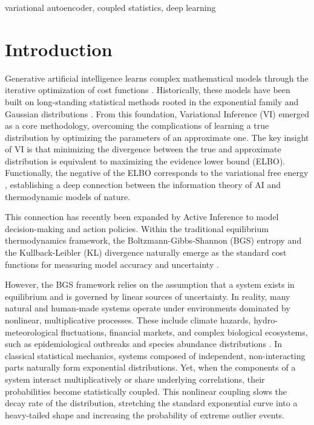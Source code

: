 \documentclass[twoside,11pt]{article}
\begin{document}
\begin{keywords}
  variational autoencoder, coupled statistics, deep learning
\end{keywords}

\section{Introduction}

Generative artificial intelligence learns complex mathematical models through the iterative optimization of cost functions \citep{bengioDeepLearning2017, kingmaIntroductionVariationalAutoencoders2019}. Historically, these models have been built on long-standing statistical methods rooted in the exponential family and Gaussian distributions \citep{amariInformationGeometryIts2016}. From this foundation, Variational Inference (VI) \citep{bleiVariationalInferenceReview2017} emerged as a core methodology, overcoming the complications of learning a true distribution by optimizing the parameters of an approximate one. The key insight of VI is that minimizing the divergence between the true and approximate distribution is equivalent to maximizing the evidence lower bound (ELBO). Functionally, the negative of the ELBO corresponds to the variational free energy \citep{fristonVariationalFreeEnergy2007}, establishing a deep connection between the information theory of AI and thermodynamic models of nature. 

This connection has recently been expanded by Active Inference \citep{parrActiveInferenceFree2022} to model decision-making and action policies. Within the traditional equilibrium thermodynamics framework, the Boltzmann-Gibbs-Shannon (BGS) entropy and the Kullback-Leibler (KL) divergence naturally emerge as the standard cost functions for measuring model accuracy and uncertainty \citep{jaynesInformationTheoryStatistical1957, mackayInformationTheoryInference2003}.

However, the BGS framework relies on the assumption that a system exists in equilibrium and is governed by linear sources of uncertainty. In reality, many natural and human-made systems operate under environments dominated by nonlinear, multiplicative processes. These include climate hazards, hydro-meteorological fluctuations, financial markets, and complex biological ecosystems, such as epidemiological outbreaks and species abundance distributions  \citep{clausetPowerLawDistributionsEmpirical2009, resnickHeavyTailPhenomenaProbabilistic2007, arnoldParetoDistribution2015, pearsonStudentsCollectedPapers1942}. In classical statistical mechanics, systems composed of independent, non-interacting parts naturally form exponential distributions. Yet, when the components of a system interact multiplicatively or share underlying correlations, their probabilities become statistically coupled. This nonlinear coupling slows the decay rate of the distribution, stretching the standard exponential curve into a heavy-tailed shape and increasing the probability of extreme outlier events.
\end{document}
